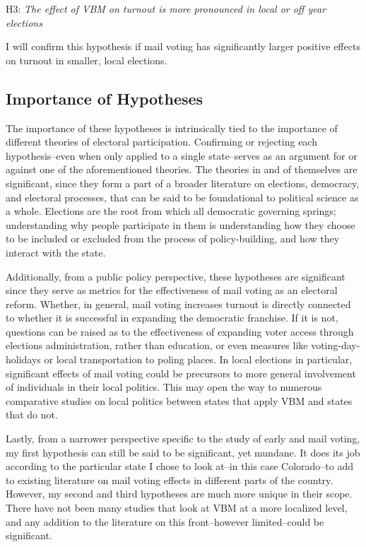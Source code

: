 \documentclass[12pt,twoside]{reedthesis}
\begin{document}
  \begin{center}    
  H3: \textit{The  effect  of  VBM  on  turnout  is  more  pronounced  in  local  or  off year elections}
  \end{center}
  
  I will confirm this hypothesis if mail voting has significantly larger
  positive effects on turnout in smaller, local elections.
  
  \subsection{Importance of Hypotheses}\label{importance-of-hypotheses}
  
  The importance of these hypotheses is intrinsically tied to the
  importance of different theories of electoral participation. Confirming
  or rejecting each hypothesis--even when only applied to a single
  state--serves as an argument for or against one of the aforementioned
  theories. The theories in and of themselves are significant, since they
  form a part of a broader literature on elections, democracy, and
  electoral processes, that can be said to be foundational to political
  science as a whole. Elections are the root from which all democratic
  governing springs; understanding why people participate in them is
  understanding how they choose to be included or excluded from the
  process of policy-building, and how they interact with the state.
  
  Additionally, from a public policy perspective, these hypotheses are
  significant since they serve as metrics for the effectiveness of mail
  voting as an electoral reform. Whether, in general, mail voting
  increases turnout is directly connected to whether it is successful in
  expanding the democratic franchise. If it is not, questions can be
  raised as to the effectiveness of expanding voter access through
  elections administration, rather than education, or even measures like
  voting-day-holidays or local transportation to poling places. In local
  elections in particular, significant effects of mail voting could be
  precursors to more general involvement of individuals in their local
  politics. This may open the way to numerous comparative studies on local
  politics between states that apply VBM and states that do not.
  
  Lastly, from a narrower perspective specific to the study of early and
  mail voting, my first hypothesis can still be said to be significant,
  yet mundane. It does its job according to the particular state I chose
  to look at--in this case Colorado--to add to existing literature on mail
  voting effects in different parts of the country. However, my second and
  third hypotheses are much more unique in their scope. There have not
  been many studies that look at VBM at a more localized level, and any
  addition to the literature on this front--however limited--could be
  significant.
  
\end{document}
